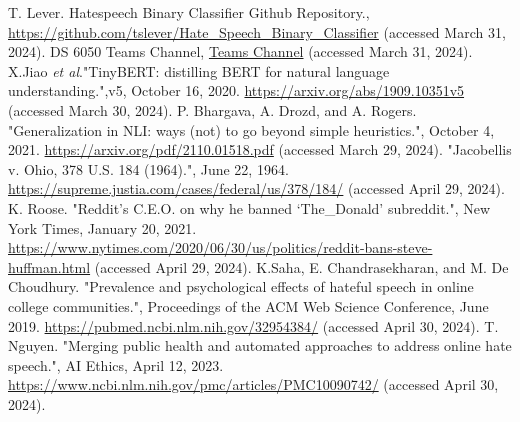 \documentclass[conference]{IEEEtran}
\begin{document}
\begin{thebibliography}{00}
 T. Lever. Hatespeech Binary Classifier Github Repository., \href{https://github.com/tslever/Hate_Speech_Binary_Classifier}{https://github.com/tslever/Hate_Speech_Binary_Classifier} (accessed March 31, 2024).
 DS 6050 Teams Channel, \href{https://myuva.sharepoint.com/:f:/s/DeepLearningProject197/Et06vD0Kl0xJtcE_D2ZOK1gB96t8YuGoZFToUYcM4qPz2A?e=e8TSxx}{Teams Channel} (accessed March 31, 2024).
X.Jiao \textit{et al}."TinyBERT: distilling BERT for natural language understanding.",v5, October 16, 2020. \href{https://arxiv.org/abs/1909.10351v5}{https://arxiv.org/abs/1909.10351v5} (accessed March 30, 2024). 
 P. Bhargava, A. Drozd, and A. Rogers. "Generalization in NLI: ways (not) to go beyond simple heuristics.", October 4, 2021. \href{https://arxiv.org/pdf/2110.01518.pdf}{https://arxiv.org/pdf/2110.01518.pdf} (accessed March 29, 2024). 
"Jacobellis v. Ohio, 378 U.S. 184 (1964).", June 22, 1964. \href{https://supreme.justia.com/cases/federal/us/378/184/}{https://supreme.justia.com/cases/federal/us/378/184/} (accessed April 29, 2024).
 K. Roose. "Reddit’s C.E.O. on why he banned ‘The\_Donald’ subreddit.", New York Times, January 20, 2021. \href{https://www.nytimes.com/2020/06/30/us/politics/reddit-bans-steve-huffman.html}{https://www.nytimes.com/2020/06/30/us/politics/reddit-bans-steve-huffman.html} (accessed April 29, 2024).
K.Saha, E. Chandrasekharan, and M. De Choudhury. "Prevalence and psychological effects of hateful speech in online college communities.", Proceedings of the ACM Web Science Conference, June 2019. \href{https://pubmed.ncbi.nlm.nih.gov/32954384/}{https://pubmed.ncbi.nlm.nih.gov/32954384/} (accessed April 30, 2024).
T. Nguyen. "Merging public health and automated approaches to address online hate speech.", AI Ethics, April 12, 2023. \href{https://www.ncbi.nlm.nih.gov/pmc/articles/PMC10090742/}{https://www.ncbi.nlm.nih.gov/pmc/articles/PMC10090742/} (accessed April 30, 2024).


\end{thebibliography}
\end{document}
